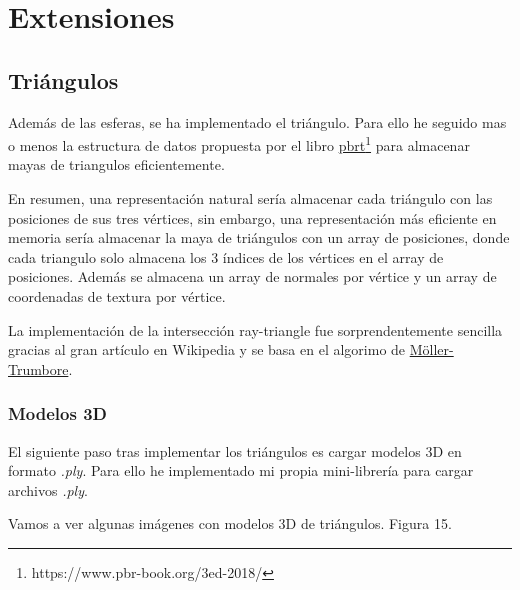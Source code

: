 \documentclass{article}
\begin{document}
\section{Extensiones}
\subsection{Triángulos}
Además de las esferas, se ha implementado el triángulo. Para ello he seguido mas
o menos la estructura de datos propuesta por el libro
\href{https://www.pbr-book.org/3ed-2018/Shapes/Triangle_Meshes}{pbrt}\footnote{https://www.pbr-book.org/3ed-2018/}
para almacenar mayas de triangulos eficientemente.

En resumen, una representación natural sería almacenar cada triángulo con las
posiciones de sus tres vértices, sin embargo, una representación más eficiente
en memoria sería almacenar la maya de triángulos con un array de posiciones,
donde cada triangulo solo almacena los 3 índices de los vértices en el array de
posiciones. Además se almacena un array de normales por vértice y un array de
coordenadas de textura por vértice.

La implementación de la intersección ray-triangle fue sorprendentemente sencilla
gracias al gran artículo en Wikipedia y se basa en el algorimo de
\href{https://en.wikipedia.org/wiki/M%C3%B6ller%E2%80%93Trumbore_intersection_algorithm}{Möller-Trumbore}.

\subsubsection{Modelos 3D}
El siguiente paso tras implementar los triángulos es cargar modelos 3D en
formato \textit{.ply}. Para ello he implementado mi propia mini-librería para
cargar archivos \textit{.ply}.

Vamos a ver algunas imágenes con modelos 3D de triángulos. Figura 15.
\end{document}
